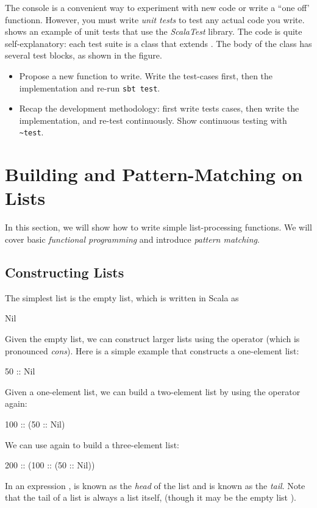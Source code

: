 \documentclass{book}
\begin{document}
The \sbt{} console is a convenient way to experiment with new code or write
a ``one off' functionn. However, you must write \emph{unit tests} to test
any actual code you write.  shows an example of
unit tests that use the \emph{ScalaTest} library. The code is quite self-explanatory:
each test suite is a class that extends .
The body of the class has several test blocks, as shown in the figure.

\begin{instructor}

\begin{itemize}

\item Propose a new function to write. Write the test-cases first, then
the implementation and re-run \verb|sbt test|.

\item Recap the development methodology: first write tests cases, then
write the implementation, and re-test continuously. Show continuous
testing with \verb|~test|.

\end{itemize}


\end{instructor}

\section{Building and Pattern-Matching on Lists}


In this section, we will show how to write simple list-processing functions. We
will cover basic \emph{functional programming} and introduce \emph{pattern
matching}.

\subsection{Constructing Lists}

The simplest list is the empty list, which is written in Scala as
%
\begin{scalacode}
Nil
\end{scalacode}
%
Given the empty list, we can construct larger lists using the \scalainline{::}
operator (which is pronounced \emph{cons}). Here is a simple example that
constructs a one-element list:
%
\begin{scalacode}
50 :: Nil
\end{scalacode}
Given a one-element list, we can build a two-element list by using the
\scalainline{::} operator again:
%
\begin{scalacode}
100 :: (50 :: Nil)
\end{scalacode}
%
We can use \scalainline{::} again to build a three-element list:
%
\begin{scalacode}
200 :: (100 :: (50 :: Nil))
\end{scalacode}
%
In an expression ,
 is known as the \emph{head} of the list and  is
known as the \emph{tail}. Note that the tail of a list is always a list itself,
(though it may be the empty list ).
\end{document}
